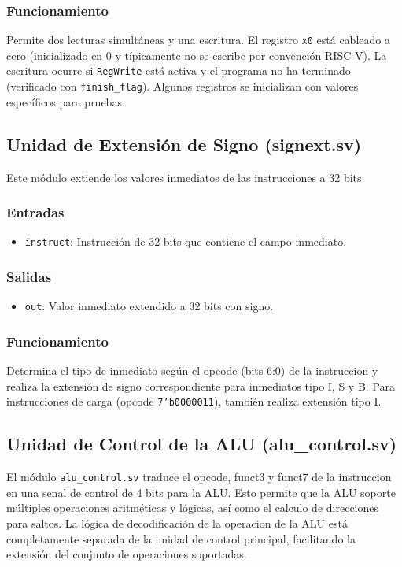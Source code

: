 \documentclass[conference]{IEEEtran}
\begin{document}
\subsubsection{Funcionamiento}
Permite dos lecturas simultáneas y una escritura. El registro \texttt{x0} está cableado a cero (inicializado en 0 y típicamente no se escribe por convención RISC-V). La escritura ocurre si \texttt{RegWrite} está activa y el programa no ha terminado (verificado con \texttt{finish\_flag}). Algunos registros se inicializan con valores específicos para pruebas.

\subsection{Unidad de Extensión de Signo (signext.sv)}
Este módulo extiende los valores inmediatos de las instrucciones a 32 bits.
\subsubsection{Entradas}
\begin{itemize}
    \item \texttt{instruct}: Instrucción de 32 bits que contiene el campo inmediato.
\end{itemize}
\subsubsection{Salidas}
\begin{itemize}
    \item \texttt{out}: Valor inmediato extendido a 32 bits con signo.
\end{itemize}
\subsubsection{Funcionamiento}
Determina el tipo de inmediato según el opcode (bits 6:0) de la instruccion y realiza la extensión de signo correspondiente para inmediatos tipo I, S y B. Para instrucciones de carga (opcode \texttt{7'b0000011}), también realiza extensión tipo I.

\subsection{Unidad de Control de la ALU (alu\_control.sv)}
El módulo \texttt{alu\_control.sv} traduce el opcode, funct3 y funct7 de la instruccion en una senal de control de 4 bits para la ALU. Esto permite que la ALU soporte múltiples operaciones aritméticas y lógicas, así como el calculo de direcciones para saltos. La lógica de decodificación de la operacion de la ALU está completamente separada de la unidad de control principal, facilitando la extensión del conjunto de operaciones soportadas.
\end{document}
